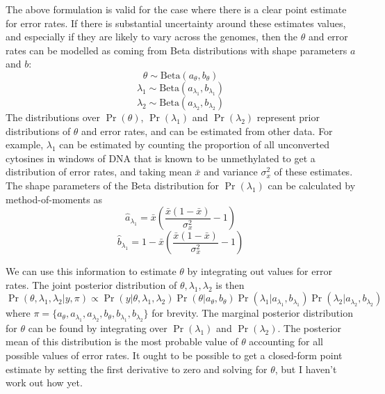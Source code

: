 \documentclass[12pt,longbibliography]{article}
\begin{document}
The above formulation is valid for the case where there is a clear point estimate for error rates.
If there is substantial uncertainty around these estimates values, and especially if they are likely to vary across the genomes, then the $\theta$ and error rates can be modelled as coming from Beta distributions with shape parameters $a$ and $b$:
\begin{equation}
    \theta \sim \textrm{Beta}(a_{\theta}, b_{\theta})
\end{equation}
\begin{equation}
    \lambda_1 \sim \textrm{Beta}(a_{\lambda_1}, b_{\lambda_1})
\end{equation}
\begin{equation}
    \lambda_2 \sim \textrm{Beta}(a_{\lambda_2}, b_{\lambda_2})
\end{equation}
The distributions over $\Pr(\theta)$, $\Pr(\lambda_1)$ and $\Pr(\lambda_2)$ represent prior distributions of $\theta$ and error rates, and can be estimated from other data.
For example, $\lambda_1$ can be estimated by counting the proportion of all unconverted cytosines in windows of DNA that is known to be unmethylated to get a distribution of error rates, and taking mean $\bar{x}$ and variance $\sigma^2_x$ of these estimates.
The shape parameters of the Beta distribution for $\Pr(\lambda_1)$ can be calculated by method-of-moments as
\begin{equation}
    \hat{a}_{\lambda_1} = \bar{x}(\frac{\bar{x}(1-\bar{x})}{\sigma^2_x}-1)
\end{equation}
\begin{equation}
    \hat{b}_{\lambda_1} = 1-\bar{x}(\frac{\bar{x}(1-\bar{x})}{\sigma^2_x}-1) 
\end{equation}

We can use this information to estimate $\theta$ by integrating out values for error rates.
The joint posterior distribution of $\theta, \lambda_1, \lambda_2$ is then
\begin{equation}
    \Pr(\theta, \lambda_1, \lambda_2 | y, \pi)
    \propto 
    \Pr(y | \theta, \lambda_1, \lambda_2)
    \Pr(\theta | a_{\theta}, b_{\theta})
    \Pr(\lambda_1 | a_{\lambda_1}, b_{\lambda_1})
    \Pr(\lambda_2 | a_{\lambda_2}, b_{\lambda_2})
\end{equation}
where $\pi=\{a_{\theta}, a_{\lambda_1}, a_{\lambda_2}, b_{\theta}, b_{\lambda_1}, b_{\lambda_2}\}$ for brevity.
The marginal posterior distribution for $\theta$ can be found by integrating over $\Pr(\lambda_1)$ and $\Pr(\lambda_2)$.
The posterior mean of this distribution is the most probable value of $\theta$ accounting for all possible values of error rates. It ought to be possible to get a closed-form point estimate by setting the first derivative to zero and solving for $\theta$, but I haven't work out how yet.
\end{document}
